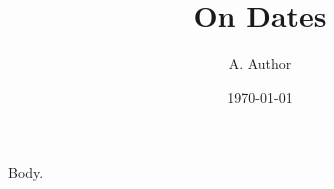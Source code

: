 \documentclass{article}
\title{On Dates}
\author{A. Author}
\date{\today}
\begin{document}
\maketitle
Body.
\end{document}
